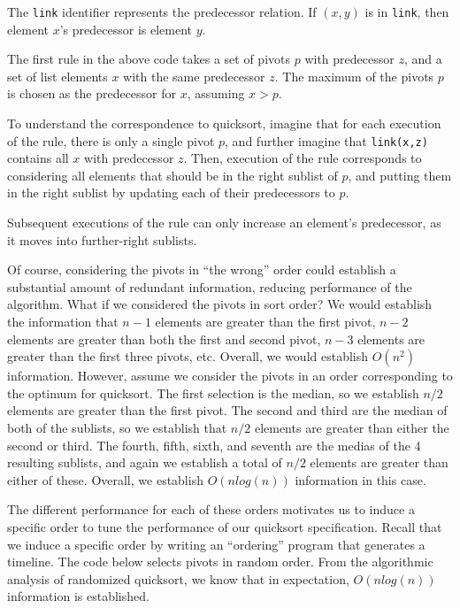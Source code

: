 The {\tt link} identifier represents the predecessor relation.  If $(x,y)$ is in {\tt link}, then element $x$'s predecessor is element $y$.

The first rule in the above code takes a set of pivots $p$ with predecessor $z$, and a set of list elements $x$ with the same predecessor $z$.  The maximum of the pivots $p$ is chosen as the predecessor for $x$, assuming $x > p$.

To understand the correspondence to quicksort, imagine that for each execution of the rule, there is only a single pivot $p$, and further imagine that {\tt link(x,z)} contains all $x$ with predecessor $z$.  Then, execution of the rule corresponds to considering all elements that should be in the right sublist of $p$, and putting them in the right sublist by updating each of their predecessors to $p$.  

Subsequent executions of the rule can only increase an element's predecessor, as it moves into further-right sublists.

Of course, considering the pivots in “the wrong” order could establish a substantial amount of redundant information, reducing performance of the algorithm.  What if we considered the pivots in sort order?  We would establish the information that $n-1$ elements are greater than the first pivot, $n-2$ elements are greater than both the first and second pivot, $n-3$ elements are greater than the first three pivots, etc.  Overall, we would establish $O(n^2)$ information.  However, assume we consider the pivots in an order corresponding to the optimum for quicksort.  The first selection is the median, so we establish $n/2$ elements are greater than the first pivot.  The second and third are the median of both of the sublists, so we establish that $n/2$ elements are greater than either the second or third.  The fourth, fifth, sixth, and seventh are the medias of the 4 resulting sublists, and again we establish a total of $n/2$ elements are greater than either of these.  Overall, we establish $O(n log(n))$ information in this case.

The different performance for each of these orders motivates us to induce a specific order to tune the performance of our quicksort specification.  Recall that we induce a specific order by writing an ``ordering'' program that generates a timeline.  The code below selects pivots in random order.  From the algorithmic analysis of randomized quicksort, we know that in expectation, $O(n log(n))$ information is established.

